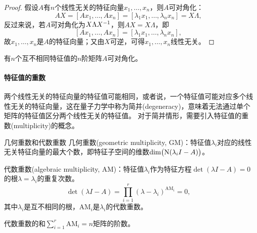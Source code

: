 \begin{proof}
	假设$A$有$n$个线性无关的特征向量$x_1,\ldots,x_n$，则$A$可对角化：
	\[
		AX=[Ax_1,\ldots,Ax_n]=[\lambda_1x_1,\ldots,\lambda_nx_n]=X\Lambda,
	\]
	反过来说，若$A$可对角化为$X\Lambda X^{-1}$，则$AX=X\Lambda$，即
	\[
		[Ax_1,\ldots,Ax_n]=[\lambda_1x_1,\ldots,\lambda_nx_n],
	\]
	故$x_1,\ldots,x_n$是$A$的特征向量；又由$X$可逆，可得$x_1,\ldots,x_n$线性无关。
\end{proof}

\begin{corollary}
	有$n$个互不相同特征值的$n$阶矩阵$A$可对角化。
\end{corollary}

\paragraph{特征值的重数}

两个线性无关的特征向量的特征值可能相同，或者说，一个特征值可能对应多个线性无关的特征向量，这在量子力学中称为简并(degeneracy)，意味着无法通过单个矩阵的特征值区分两个线性无关的特征值。
对于简并情形，需要引入特征值的重数(multiplicity)的概念。

\newcommand*{\GM}{\mathrm{GM}}
\newcommand*{\AM}{\mathrm{AM}}

\begin{definition}{几何重数和代数重数}{}
	几何重数(geometric multiplicity, GM)：特征值$\lambda_i$对应的线性无关特征向量的最大个数，即特征子空间的维数$\dim\bigl(\operatorname{N}(\lambda_iI-A)\bigr)$。

	代数重数(algebraic multiplicity, AM)：特征值$\lambda_i$作为特征方程$\det(\lambda I-A)=0$的根$\lambda=\lambda_i$的重复次数。
	\[
		\det(\lambda I-A)=\prod_{i=1}^r(\lambda-\lambda_i)^{\AM_i}=0,
	\]
	其中$\lambda_i$是互不相同的根，$\AM_i$是$\lambda_i$的代数重数。
\end{definition}

\begin{corollary}
	代数重数的和$\textstyle\sum_{i=1}^r\AM_i=n$矩阵的阶数。
\end{corollary}

